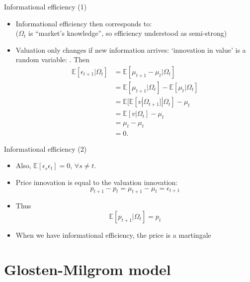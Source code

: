 \documentclass[english,10pt
,aspectratio=169
]{beamer}
\begin{document}
\begin{frame}{Informational efficiency (1)}
\begin{itemize}
	\item Informational efficiency then corresponds to: 
	\\
	($\Omega_t$ is ``market's knowledge'', so efficiency understood as semi-strong)
	\item Valuation only changes if new information arrives: `innovation in value' is a random variable: . Then
	\begin{align*}
		\mathbb{E}[\epsilon_{t+1}|\Omega_t] 
		& = \mathbb{E}[\mu_{t+1} - \mu_t|\Omega_t]\\
		& = \mathbb{E}[\mu_{t+1}|\Omega_t] - \mathbb{E}[\mu_t|\Omega_t]\\  
		& = \mathbb{E}[ \mathbb{E}[v|\Omega_{t+1}]|\Omega_t] - \mu_t\\  
		& = \mathbb{E}[v|\Omega_t] - \mu_t\\  
		& = \mu_t- \mu_t\\  
		& = 0.
	\end{align*}
\end{itemize}
\end{frame}


\begin{frame}{Informational efficiency (2)}
	\begin{itemize}
	 \item Also, $\mathbb{E}[\epsilon_{s}\epsilon_t]=0$, $\forall s \ne t$.
	\item Price innovation is equal to the valuation innovation:
	\[
	p_{t+1} - p_t = \mu_{t+1} - \mu_t = \epsilon_{t+1}
	\]
	\item Thus
	\[
	\mathbb{E}[p_{t+1}|\Omega_{t}] = p_t
	\]
	\item When we have informational efficiency, the price is a \alert{martingale}
\end{itemize}
\end{frame}



\section{Glosten-Milgrom model}
\end{document}
